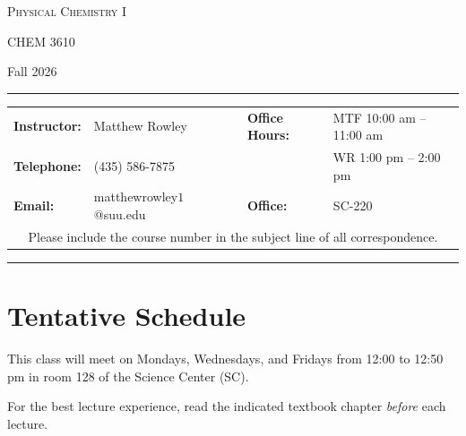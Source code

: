 \documentclass[12pt, letterpaper]{article}
\begin{document}
\begin{center}
	{\Large \textsc{Physical Chemistry I}}
	
	CHEM 3610
\end{center}

\begin{center}
	{\large Fall 2026}
\end{center}
\begin{center}
	\rule{0.99\textwidth}{0.4pt}
	\begin{tabular}{llcll}
		\textbf{Instructor:} & Matthew Rowley           &  & \textbf{Office Hours:} & MTF 10:00 am -- 11:00 am \\
		\textbf{Telephone:}  & (435) 586-7875           &  &                        & WR 1:00 pm -- 2:00 pm    \\
		\textbf{Email:}      & matthewrowley$1$@suu.edu &  & \textbf{Office:}       & SC-220                   \\
		\multicolumn{5}{c}{Please include the course number in the subject line of all correspondence.}
	\end{tabular}
	\rule{0.99\textwidth}{0.4pt}
\end{center}

\section*{Tentative Schedule}
This class will meet on Mondays, Wednesdays, and Fridays from 12:00 to 12:50 pm in room 128 of the Science Center (SC).

\noindent For the best lecture experience, read the indicated textbook chapter \emph{before} each lecture.
\end{document}
